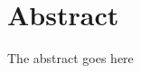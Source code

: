 \documentclass[a4paper]{scrbook}
\begin{document}


\chapter*{Abstract}
The abstract goes here

\tableofcontents





\end{document}
